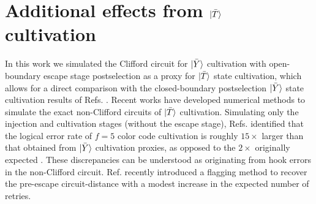 \documentclass[
    reprint,
    amsmath,amssymb,
    nofootinbib,
    superscriptaddress,
    aps,
    noeprint,
    longbibliography,
    prl
]{revtex4-2}
\theoremstyle{plain}
\begin{document}



\section{Additional effects from \texorpdfstring{$\ket{\bar T}$}{T} cultivation}
\label{app:t-vs-y}
In this work we simulated the Clifford circuit for $\ket{\bar Y}$ cultivation with open-boundary escape
stage postselection as a proxy for $\ket{\bar T}$ state cultivation, which allows for a direct comparison
with the closed-boundary postselection $\ket{\bar Y}$ state cultivation results of Refs.
\cite{sahay2026fold, gidney_magic_2024}. Recent works \cite{li2025soft, chase_clifft_2026,
takada2026exactefficientsimulationnoisy, hartweg_comparing_2026, wan_exact_2026,
chan_diagnosing_2026} have developed numerical methods to simulate the exact non-Clifford circuits
of $\ket{\bar T}$ cultivation. Simulating only the injection and cultivation stages (without the escape
stage), Refs. \cite{li2025soft, chase_clifft_2026, wan_exact_2026} identified that the logical error
rate of $f=5$ color code cultivation is roughly $15 \times$ larger than that obtained from
$\ket{\bar Y}$ cultivation proxies, as opposed to the $2 \times$ originally expected
\cite{gidney_magic_2024}. These discrepancies can be understood as originating from hook errors in
the non-Clifford circuit. Ref. \cite{chan_diagnosing_2026} recently introduced a flagging method to
recover the pre-escape circuit-distance with a modest increase in the expected number of retries.
\end{document}
